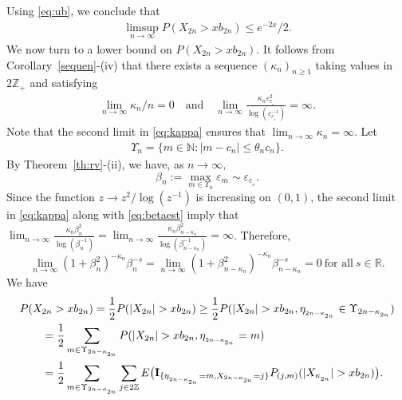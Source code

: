 \documentclass[12pt]{amsart}
\begin{document}
Using \eqref{eq:ub}, we conclude that
\begin{eqnarray*}
\limsup_{n\to\infty} P(X_{2n}> xb_{2n}) \leq e^{-2x}/2.\end{eqnarray*}
We now turn to a lower bound on $P(X_{2n}> xb_{2n}).$ It follows from Corollary~\ref{sequen}-(iv)
that there exists a sequence $(\kappa_n)_{n\ge 1}$ taking values in
$2{{\mathbb Z}}_+$ and satisfying
\begin{align}
\label{eq:kappa}
\lim_{n\to\infty} \kappa_n/n=0 \quad \mbox{and} \quad
\lim_{n\to\infty} \frac{\kappa_n {\varepsilon}_{c_{_n}}^2}{\log ({\varepsilon}_{c_{_n}}^{-1})}=\infty.
\end{align}
Note that the second limit in \eqref{eq:kappa} ensures that $\lim_{n\to\infty}
\kappa_n=\infty$.  Let
\begin{eqnarray}
\label{calmn}
\Upsilon_n=\{m\in {{\mathbb N}}: |m-c_n|\leq \theta_n c_n\}.
\end{eqnarray}
By Theorem~\ref{th:rv}-(ii), we have, as $n\to\infty,$
\begin{equation}
\label{eq:betaest} \beta_n:= \max_{m\in \Upsilon_n } {\varepsilon}_m \sim {\varepsilon}_{c_{_n}}.
\end{equation}
Since the function $z\to z^2 / \log (z^{-1})$ is increasing on
$(0,1)$, the second limit in \eqref{eq:kappa} along with \eqref{eq:betaest}
imply that $\lim_{n\to\infty} \frac{\kappa_n \beta_n^2}{\log
(\beta_n^{-1})}=\lim_{n\to\infty} \frac{\kappa_n \beta_{n-\kappa_n}^2}{\log
(\beta_{n-\kappa_n}^{-1})}=\infty$. Therefore,
\begin{equation}
\label{eq:makesure} \lim_{n\to\infty}
(1+\beta_n^2)^{-\kappa_n}\beta_n^{-s}=\lim_{n\to\infty}
(1+\beta_{n-\kappa_n}^2)^{-\kappa_n}\beta_{n-\kappa_n}^{-s}=0~\mbox{for all}~s \in {{\mathbb R}}.
\end{equation}
We have
\begin{align}
\nonumber
& P(X_{2n} >xb_{2n} )=\frac{1}{2} P(|X_{2n}| >xb_{2n} )\ge \frac{1}{2} P(|X_{2n}| >
xb_{2n},\eta_{_{2n-\kappa_{_{2n}}}}\in \Upsilon_{2n-\kappa_{_{2n}}})\\
\nonumber & \qquad =\frac{1}{2} \sum_{  m \in \Upsilon_{2n-\kappa_{_{2n}}}}
P(|X_{2n}|> xb_{2n},\eta_{_{2n-\kappa_{_{2n}}}}=m)\\
\label{eq:hamechaye}&\qquad =\frac{1}{2}\sum_{
m \in \Upsilon_{2n-\kappa_{_{2n}}}}
\sum_{j\in 2{{\mathbb Z}}}  E \bigl
({\mbox{\bf I}}_{\{\eta_{_{2n-\kappa_{_{2n}}}}=m,X_{2n-\kappa_{_{2n}}}=j\}}
P_{(j,m)}(|X_{\kappa_{_{2n}}}| > xb_{2n})\bigr).
\end{align}
\end{document}
